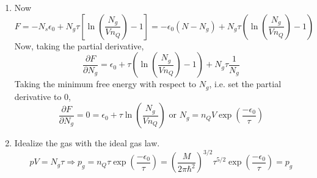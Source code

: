 \begin{enumerate}
\[
\boxed{ F = F_s + F_g = -N_s \epsilon_0 + N\tau \left[ \ln{ \left( \frac{N_g}{Vn_Q} \right) } - 1 \right] }
\]
\item[(b)] Now
\[
F = -N_s \epsilon_0 + N_g \tau [ \ln{ \left( \frac{N_g}{Vn_Q} \right)} -1 ] = -\epsilon_0 (N-N_g) + N_g \tau \left( \ln{ \left( \frac{N_g}{Vn_Q} \right) - 1 } \right)
\]
Now, taking the partial derivative,
\[
\frac{ \partial F}{ \partial N_g} = \epsilon_0 + \tau \left( \ln{ \left( \frac{N_g}{Vn_Q} \right) }-1 \right) + N_g \tau \frac{1}{N_g}
\]
Taking the minimum free energy with respect to $N_g$, i.e. set the partial derivative to $0$,
\[
\frac{ \partial F}{ \partial N_g } = 0 = \epsilon_0 + \tau \ln{\left( \frac{N_g}{Vn_Q} \right) } \text{ or } \boxed{ N_g = n_Q V \exp{ \left( \frac{-\epsilon_0}{\tau} \right) } }
\]
\item[(c)] Idealize the gas with the ideal gas law.  
\[
pV = N_g \tau \Longrightarrow p_g = n_Q \tau \exp{ \left( \frac{-\epsilon_0}{\tau} \right) } = \boxed{ \left( \frac{M}{2\pi \hbar^2 } \right)^{3/2} \tau^{5/2} \exp{ \left( \frac{-\epsilon_0}{\tau} \right) } = p_g }
\]
\end{enumerate}


